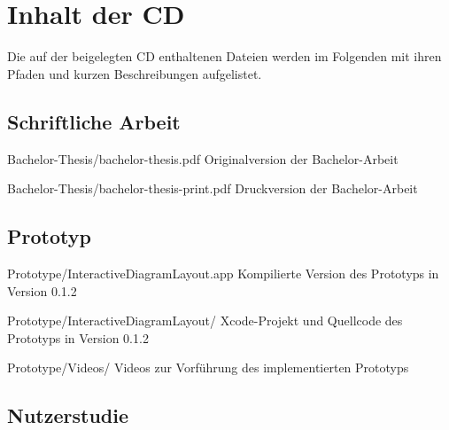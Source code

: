 
\chapter{Inhalt der CD}
\label{chapter:cd-content}

Die auf der beigelegten CD enthaltenen Dateien werden im Folgenden mit ihren Pfaden und kurzen Beschreibungen aufgelistet.

\newenvironment{fileslist}{
    \renewcommand\descriptionlabel[1]{\texttt{##1}}
    \setlength{\leftmargini}{0em}
    \begin{description}[style=nextline]
}{
    \end{description}
}

\section{Schriftliche Arbeit}

\begin{fileslist}

\item[Bachelor-Thesis/bachelor-thesis.pdf] 
Originalversion der Bachelor-Arbeit

\item[Bachelor-Thesis/bachelor-thesis-print.pdf] 
Druckversion der Bachelor-Arbeit

\end{fileslist}

\section{Prototyp}
\label{sec:cd-content-prototype}

\begin{fileslist}

\item[Prototype/InteractiveDiagramLayout.app]
Kompilierte Version des Prototyps in Version 0.1.2

\item[Prototype/InteractiveDiagramLayout/] 
Xcode-Projekt und Quellcode des Prototyps in Version 0.1.2

\item[Prototype/Videos/] 
Videos zur Vorführung des implementierten Prototyps

\end{fileslist}

\section{Nutzerstudie}
\label{sec:files-user-study}

